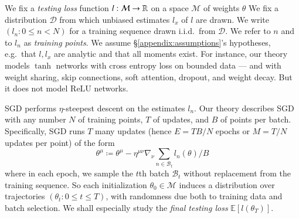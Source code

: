 \documentclass[final,12pt]{colt2021} %
\newcommand{\expc}{\mathbb{E}}
\newcommand{\Bb}{\mathcal{B}}
\newcommand{\Dd}{\mathcal{D}}
\newcommand{\Mm}{\mathcal{M}}
\begin{document}
            We fix a \emph{testing loss} function $l:\Mm\to\RR$ on a space
            $\Mm$ of weights $\theta$  We fix a distribution $\Dd$ from which
            unbiased estimates $l_x$ of $l$ are drawn.  We write $(l_n:
            0\leq n<N)$ for a training sequence drawn i.i.d.\ from $\Dd$.  We
            refer to $n$ and to $l_n$ as \emph{training points}.  We assume
            \S\ref{appendix:assumptions}'s hypotheses, e.g.\ that $l, l_x$ are
            analytic and that all moments exist.
            For instance, our theory models $\tanh$ networks with cross entropy
            loss on bounded data --- and with weight sharing, skip connections,
            soft attention, dropout, and weight decay.  But it does not model
            $\text{ReLU}$ networks.


            SGD performs $\eta$-steepest descent on the estimates $l_n$.  Our
            theory describes SGD with any number
                 $N$ of training points,
                 $T$ of updates, and 
                 $B$ of points per batch.
            Specifically, SGD runs $T$ many updates (hence $E=TB/N$ epochs or
            $M=T/N$ updates per point) of the form
            $$
                \textstyle
                \theta^\mu
                \coloneqq
                \theta^\mu -
                \eta^{\mu\nu} \nabla_\nu
                    \sum_{n\in \Bb_t} l_n(\theta) / B
            $$
            where in each epoch, we sample the $t$th batch $\Bb_t$ without
            replacement from the training sequence.  So each initialization
            $\theta_0 \in \Mm$ induces a distribution over
            trajectories $(\theta_t: 0\leq t \leq T)$, with randomness due both
            to training data and batch selection.  We shall especially study
            the \emph{final testing loss} $\expc[l(\theta_T)]$.

\end{document}
